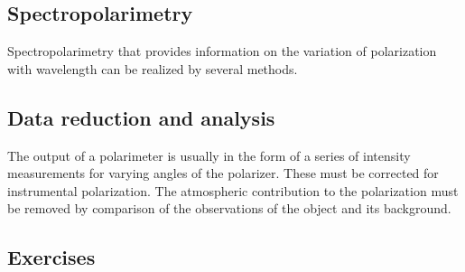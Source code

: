 \subsection{Spectropolarimetry}

Spectropolarimetry that provides information on the variation of polarization with wavelength can be realized by several methods. 

\subsection{Data reduction and analysis}

The output of a polarimeter is usually in the form of a series of
intensity measurements for varying angles of the polarizer. These must
be corrected for instrumental polarization. The atmospheric
contribution to the polarization must be removed by comparison of the
observations of the object  and its background. 

\subsection{Exercises}

